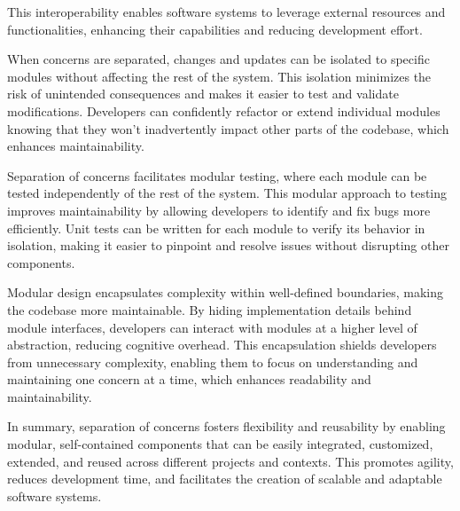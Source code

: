 This interoperability enables software systems to leverage external resources and functionalities, enhancing their capabilities and reducing development effort.
\par
When concerns are separated, changes and updates can be isolated to specific modules without affecting the rest of the system.
This isolation minimizes the risk of unintended consequences and makes it easier to test and validate modifications.
Developers can confidently refactor or extend individual modules knowing that they won't inadvertently impact other parts of the codebase, which enhances maintainability.
\par
Separation of concerns facilitates modular testing, where each module can be tested independently of the rest of the system.
This modular approach to testing improves maintainability by allowing developers to identify and fix bugs more efficiently.
Unit tests can be written for each module to verify its behavior in isolation, making it easier to pinpoint and resolve issues without disrupting other components.
\par
Modular design encapsulates complexity within well-defined boundaries, making the codebase more maintainable.
By hiding implementation details behind module interfaces, developers can interact with modules at a higher level of abstraction, reducing cognitive overhead.
This encapsulation shields developers from unnecessary complexity, enabling them to focus on understanding and maintaining one concern at a time, which enhances readability and maintainability.
\par
In summary, separation of concerns fosters flexibility and reusability by enabling modular, self-contained components that can be easily integrated, customized, extended, and reused across different projects and contexts.
This promotes agility, reduces development time, and facilitates the creation of scalable and adaptable software systems.


